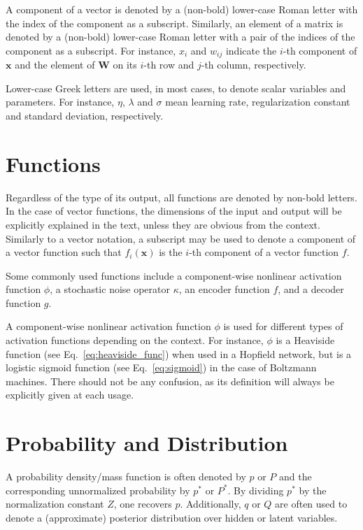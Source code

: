 \documentclass[dissertation,nocontribution]{aaltoseries}
\newcommand{\vect}[1]{\mathbf{#1}}
\newcommand{\matr}[1]{\mathbf{#1}}
\newcommand{\vx}[0]{\vect{x}}
\newcommand{\mW}[0]{\matr{W}}
\begin{document}
A component of a vector is denoted by a (non-bold)
lower-case Roman letter with the index of the component as a
subscript.  Similarly, an element of a matrix is denoted by
a (non-bold) lower-case Roman letter with a pair of the
indices of the component as a subscript. For instance, $x_i$
and $w_{ij}$ indicate the $i$-th component of $\vx$ and the
element of $\mW$ on its $i$-th row and $j$-th column,
respectively.

Lower-case Greek letters are used, in most cases, to denote
scalar variables and parameters. For instance, $\eta$,
$\lambda$ and $\sigma$ mean learning rate, 
regularization constant and standard deviation,
respectively. 

\section*{Functions}

Regardless of the type of its output, all functions are
denoted by non-bold letters. In the case of vector
functions, the dimensions of the input and output will be
explicitly explained in the text, unless they are obvious
from the context. Similarly to a vector notation, a
subscript may be used to denote a component of a vector
function such that $f_i(\vx)$ is the $i$-th component of a
vector function $f$.

Some commonly used functions include a
component-wise nonlinear activation function $\phi$, a
stochastic noise operator $\kappa$, an encoder function $f$,
and a decoder function $g$.

A component-wise nonlinear activation function $\phi$ is
used for different types of activation functions depending
on the context. For instance, $\phi$ is a Heaviside function
(see Eq.~\eqref{eq:heaviside_func}) when used in a Hopfield
network, but is a logistic sigmoid function (see
Eq.~\eqref{eq:sigmoid}) in the case of Boltzmann machines.
There should not be any confusion, as its definition
will always be explicitly given at each usage.

\section*{Probability and Distribution}

A probability density/mass function is often denoted by $p$
or $P$ and the corresponding unnormalized probability by
$p^*$ or $P^*$.  By dividing $p^*$ by the normalization
constant $Z$, one recovers $p$. Additionally, $q$ or $Q$ are
often used to denote a (approximate) posterior distribution
over hidden or latent variables. 
\end{document}
